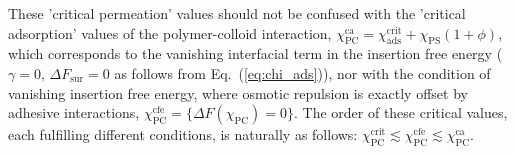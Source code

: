 \documentclass[12pt, a4paper]{article}
\begin{document}

These 'critical permeation' values should not be confused with the 'critical adsorption' values of the polymer-colloid interaction, $\chi^{\text{ca}}_{\text{PC}} = \chi_{\text{ads}}^{\text{crit}} + \chi_{\text{PS}}(1 + \phi)$, which corresponds to the vanishing interfacial term in the insertion free energy ($\gamma = 0$, $\Delta F_{\text{sur}} = 0$ as follows from Eq.~(\ref{eq:chi_ads})), nor with the condition of vanishing insertion free energy, where osmotic repulsion is exactly offset by adhesive interactions, $\chi^{\text{cfe}}_{\text{PC}} = \{\Delta F (\chi_{\text{PC}}) = 0\}$.
The order of these critical values, each fulfilling different conditions, is naturally as follows: $\chi^{\text{crit}}_{\text{PC}} \lesssim \chi^{\text{cfe}}_{\text{PC}} \lesssim \chi^{\text{ca}}_{\text{PC}}$.





\end{document}

